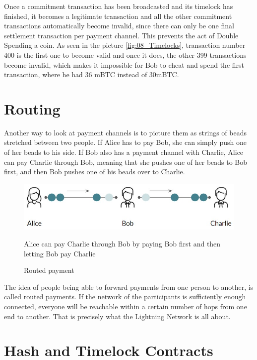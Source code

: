 \documentclass[a4paper, 12pt]{report}
\begin{document}
\par Once a commitment transaction has been broadcasted and its timelock has finished, it becomes a legitimate transaction and all the other commitment transactions automatically become invalid, since there can only be one final settlement transaction per payment channel. This prevents the act of Double Spending a coin. As seen in the picture \ref{fig:08_Timelocks}, transaction number 400 is the first one to become valid and once it does, the other 399 transactions become invalid, which makes it impossible for Bob to cheat and spend the first transaction, where he had 36 mBTC instead of 30mBTC.

\section{Routing}

\par Another way to look at payment channels is to picture them as strings of beads stretched between two people. If Alice has to pay Bob, she can simply push one of her beads to his side. If Bob also has a payment channel with Charlie, Alice can pay Charlie through Bob, meaning that she pushes one of her beads to Bob first, and then Bob pushes one of his beads over to Charlie.

\begin{figure}[H]
	\centering
	\includegraphics[width=12cm]{09_Beads}
	\caption{Routed payment}
	\medskip
	\small Alice can pay Charlie through Bob by paying Bob first and then letting Bob pay Charlie
	\label{fig:09_Beads}
\end{figure}

\par The idea of people being able to forward payments from one person to another, is called routed payments. If the network of the participants is sufficiently enough connected, everyone will be reachable within a certain number of hops from one end to another. That is precisely what the Lightning Network is all about.

\section{Hash and Timelock Contracts}
\end{document}
